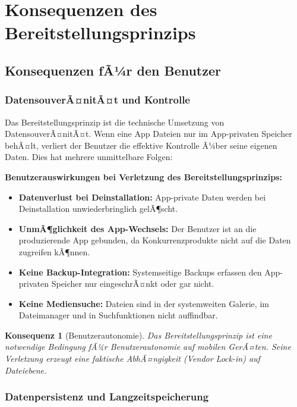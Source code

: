 ﻿\documentclass[12pt, a4paper]{article}
\newtheorem{konsequenz}[definition]{Konsequenz}
\begin{document}
\section{Konsequenzen des Bereitstellungsprinzips}
\label{sec:konsequenzen}

\subsection{Konsequenzen fÃ¼r den Benutzer}

\subsubsection{DatensouverÃ¤nitÃ¤t und Kontrolle}

Das Bereitstellungsprinzip ist die technische Umsetzung von DatensouverÃ¤nitÃ¤t.
Wenn eine App Dateien nur im App-privaten Speicher behÃ¤lt, verliert der Benutzer
die effektive Kontrolle Ã¼ber seine eigenen Daten. Dies hat mehrere unmittelbare
Folgen:

\noindent\textbf{Benutzerauswirkungen bei Verletzung des Bereitstellungsprinzips:}
\begin{itemize}[leftmargin=*]
  \item \textbf{Datenverlust bei Deinstallation:} App-private Daten werden bei
    Deinstallation unwiederbringlich gelÃ¶scht.
  \item \textbf{UnmÃ¶glichkeit des App-Wechsels:} Der Benutzer ist an die
    produzierende App gebunden, da Konkurrenzprodukte nicht auf die Daten
    zugreifen kÃ¶nnen.
  \item \textbf{Keine Backup-Integration:} Systemseitige Backups erfassen den
    App-privaten Speicher nur eingeschrÃ¤nkt oder gar nicht.
  \item \textbf{Keine Mediensuche:} Dateien sind in der systemweiten Galerie,
    im Dateimanager und in Suchfunktionen nicht auffindbar.
\end{itemize}

\begin{konsequenz}[Benutzerautonomie]
Das Bereitstellungsprinzip ist eine notwendige Bedingung fÃ¼r Benutzerautonomie
auf mobilen GerÃ¤ten. Seine Verletzung erzeugt eine faktische AbhÃ¤ngigkeit
(\emph{Vendor Lock-in}) auf Dateiebene.
\end{konsequenz}

\subsubsection{Datenpersistenz und Langzeitspeicherung}
\end{document}
